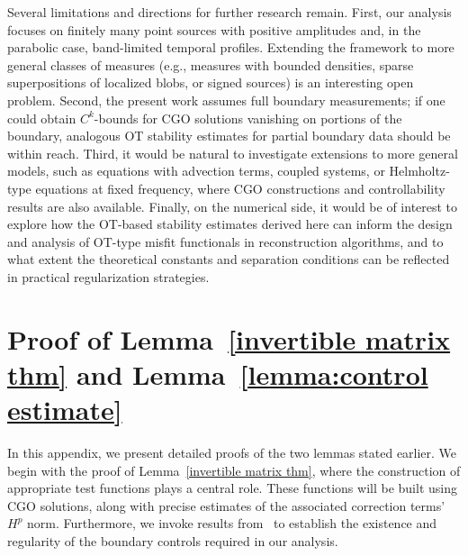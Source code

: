\documentclass[12pt]{amsart}
\begin{document}
Several limitations and directions for further research remain. First, our analysis focuses on finitely many point sources with positive amplitudes and, in the parabolic case, band-limited temporal profiles. Extending the framework to more general classes of measures (e.g., measures with bounded densities, sparse superpositions of localized blobs, or signed sources) is an interesting open problem. Second, the present work assumes full boundary measurements; if one could obtain \(C^k\)-bounds for CGO solutions vanishing on portions of the boundary, analogous OT stability estimates for partial boundary data should be within reach. Third, it would be natural to investigate extensions to more general models, such as equations with advection terms, coupled systems, or Helmholtz-type equations at fixed frequency, where CGO constructions and controllability results are also available. Finally, on the numerical side, it would be of interest to explore how the OT-based stability estimates derived here can inform the design and analysis of OT-type misfit functionals in reconstruction algorithms, and to what extent the theoretical constants and separation conditions can be reflected in practical regularization strategies.



\appendix

\section{Proof of Lemma~\ref{invertible matrix thm} and Lemma~\ref{lemma:control estimate}}
\label{appendix:proofs}
In this appendix, we present detailed proofs of the two lemmas stated earlier. We begin with the proof of Lemma~\ref{invertible matrix thm}, where the construction of appropriate test functions plays a central role. These functions will be built using CGO solutions, along with precise estimates of the associated correction terms' $H^p$ norm. Furthermore, we invoke results from~\cite{fursikov_controllability_1996} to establish the existence and regularity of the boundary controls required in our analysis.
\end{document}
